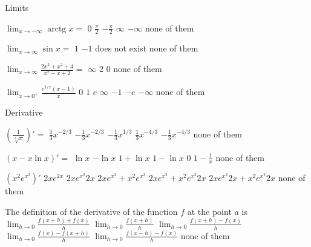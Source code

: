 \documentclass{article}
\DeclareMathOperator{\arctg}{arctg}
\begin{document}
\begin{category}{Limits}

\begin{question}
$\lim_{x\to-\infty} \arctg x=$
 $0$
 $\frac\pi2$
 $-\frac\pi2$
 $\infty$
 $-\infty$
 none of them
\end{question}

\begin{question}
$\lim_{x\to\infty}\sin x=$
 $1$
 $-1$
 does not exist
 none of them
\end{question}

\begin{question}
$\lim_{x\to\infty}\frac{2x^3+x^2+4}{x^2-x+2}=$
 $\infty$
 $2$
 $0$
 none of them
\end{question}

\begin{question}
$\lim_{x\to 0^+}\frac{e^{1/x}(x-1)}{x}$
 $0$
 $1$
 $e$
 $\infty$
 $-1$
 $-e$
 $-\infty$
 none of them
\end{question}

\end{category}

\begin{category}{Derivative}


\begin{question}
$\left(\frac 1{\sqrt[3]x}\right)'=$
 $\frac 13 x^{-2/3}$
 $-\frac 13 x^{-2/3}$
 $-\frac 13 x^{1/3}$
 $\frac 13 x^{-4/3}$
 $-\frac 13 x^{-4/3}$
 none of them
\end{question}


\begin{question}
$(x-x\ln x)'=$
 $\ln x$
 $-\ln x$
 $1+\ln x$
 $1-\ln x$
 $0$
 $1-\frac 1x$
 none of them
\end{question}

\begin{question}
$\left(x^2e^{x^2}\right)'$
 $2xe^{2x}$
 $2xe^{x^2}2x$
 $2xe^{x^2}+x^2e^{x^2}$
 $2xe^{x^2}+x^2e^{x^2}2x$
 $2xe^{x^2}2x+x^2e^{x^2}2x$
 none of them
\end{question}

\begin{question}
The definition of the derivative of the function $f$ at the point $a$ is
 $\lim_{h\to 0}\frac{f(x+h)+f(x)}{h}$
 $\lim_{h\to 0}\frac{f(x+h)}{h}$
 $\lim_{h\to 0}\frac{f(x+h)-f(x)}{h}$
 $\lim_{h\to 0}\frac{f(x)-f(x+h)}{h}$
 $\lim_{h\to 0}\frac{f(x-h)-f(x)}{h}$
 none of them
\end{question}

\end{category}
\end{document}
